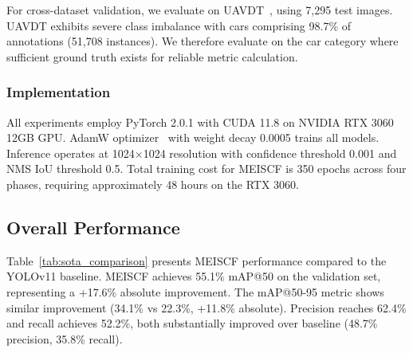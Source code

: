 \documentclass[preprint,12pt]{elsarticle}
\begin{document}
For cross-dataset validation, we evaluate on UAVDT~\cite{uavdt}, using 7,295 test
images. UAVDT exhibits severe class imbalance with cars comprising 98.7\% of
annotations (51,708 instances). We therefore evaluate on the car category where
sufficient ground truth exists for reliable metric calculation.

\subsubsection{Implementation}

All experiments employ PyTorch 2.0.1 with CUDA 11.8 on NVIDIA RTX 3060 12GB GPU.
AdamW optimizer~\cite{adamw} with weight decay 0.0005 trains all models.
Inference operates at 1024$\times$1024 resolution with confidence threshold 0.001
and NMS IoU threshold 0.5. Total training cost for MEISCF is 350 epochs across
four phases, requiring approximately 48 hours on the RTX 3060.

\subsection{Overall Performance}

Table~\ref{tab:sota_comparison} presents MEISCF performance compared to the
YOLOv11 baseline. MEISCF achieves 55.1\% mAP@50 on the validation set,
representing a +17.6\% absolute improvement. The mAP@50-95 metric shows similar
improvement (34.1\% vs 22.3\%, +11.8\% absolute). Precision reaches 62.4\% and
recall achieves 52.2\%, both substantially improved over baseline (48.7\%
precision, 35.8\% recall).
\end{document}
